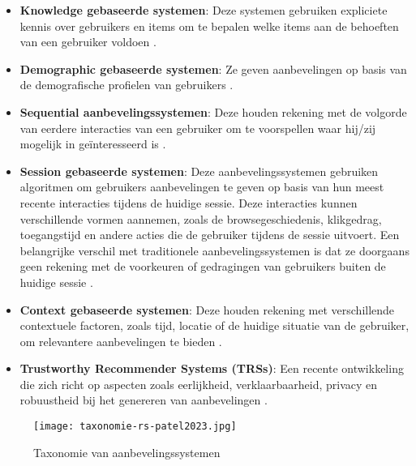 \begin{itemize}
  \item \textbf{Knowledge gebaseerde systemen}: Deze systemen gebruiken expliciete kennis over gebruikers en items om te bepalen welke items aan de behoeften van een gebruiker voldoen \autocite{Patel2023}.
  \item \textbf{Demographic gebaseerde systemen}: Ze geven aanbevelingen op basis van de demografische profielen van gebruikers \autocite{Patel2023}.
  \item \textbf{Sequential aanbevelingssystemen}: Deze houden rekening met de volgorde van eerdere interacties van een gebruiker om te voorspellen waar hij/zij mogelijk in geïnteresseerd is \autocite{Patel2023, Zangerle2022}.
  \item \textbf{Session gebaseerde systemen}: Deze aanbevelingssystemen gebruiken algoritmen om gebruikers aanbevelingen te geven op basis van hun meest recente interacties tijdens de huidige sessie. Deze interacties kunnen verschillende vormen aannemen, zoals de browsegeschiedenis, klikgedrag, toegangstijd en andere acties die de gebruiker tijdens de sessie uitvoert. Een belangrijke verschil met traditionele aanbevelingssystemen is dat ze doorgaans geen rekening met de voorkeuren of gedragingen van gebruikers buiten de huidige sessie \autocite{Patel2023}. 
  \item \textbf{Context gebaseerde systemen}: Deze houden rekening met verschillende contextuele factoren, zoals tijd, locatie of de huidige situatie van de gebruiker, om relevantere aanbevelingen te bieden \autocite{Patel2023}.
  \item \textbf{Trustworthy Recommender Systems (TRSs)}: Een recente ontwikkeling die zich richt op aspecten zoals eerlijkheid, verklaarbaarheid, privacy en robuustheid bij het genereren van aanbevelingen \autocite{Wang2024}.
\end{itemize}
\begin{figure}[h!]
  \centering
  \texttt{[image: taxonomie-rs-patel2023.jpg]}
  \caption[Taxonomie van aanbevelingssystemen]{\label{fig:TaxonomieRS} Taxonomie van aanbevelingssystemen \autocite{Patel2023}}
\end{figure}
